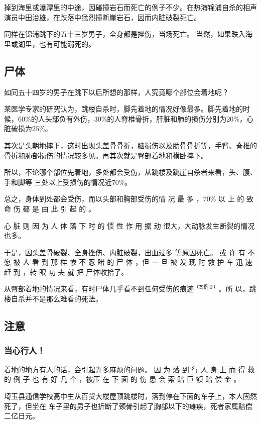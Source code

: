 \documentclass[UTF8]{ctexart}
\begin{document}
掉到海里或瀑潭里的中途，因碰撞岩石而死亡的例子不少。在热海锦浦自杀的相声演员中田治雄，在跌落中猛烈撞断崖岩石，因而内脏破裂死亡。

同样在锦浦跳下的五十三岁男子，全身都是挫伤，当场死亡。
当然，如果跌入海里或湖里，也有可能溺死的。

\subsection{尸体}

如同五十四岁的男子在跳下以后所想的那样，人究竟哪个部位会着地呢？

某医学专家的研究认为，跳楼自杀时，脚先着地的情况好像最多。脚先着地的时候，$60\%$的人头部负有外伤，$30\%$的人脊椎骨折，肝脏和肺的损伤分别为$20\%$，心 脏破损为$25\%$。

其次是头朝地摔下，这时出现头盖骨骨折，脑损伤以及肋骨骨折等，手臂、脊椎的骨折和肺部损伤的情况较多见。再其次就是臀部着地和横卧摔下。

所以，不论哪个部位先着地，多处都会受伤，从跳楼及跳崖自杀者来看，头、腹、手和脚等 三处以上受损伤的情况近$70\%$。

总之，身体到处都会受伤，而以头部和胸部受伤的情 况 最 多 ，$70\%$ 以 上 的 致 命 伤 都 是 由 此 引 起 的 。

心 脏 则 因 为 人 体 落 下 时 的 惯 性 作 用 振 动 很大，大动脉发生断裂的情况也多。

于是，因头盖骨破裂、全身挫伤、内脏破裂，出血过多 等原因死亡。 
或 许 有 不 愿 被 人 看 到 那 样 惨 不 忍 睹 的 尸 体 ，但 一 旦 被 发 现 时 救 护 车 迅 速 赶 到 ，转 眼 功 夫 就 把 尸体收拾了。

从臀部着地的情况来看，有时尸体几乎看不到任何受伤的痕迹$^{（案例９）}$。所 以，跳楼自杀并不是那么难看的死法。

\subsection{注意}

\subsubsection*{当心行人！}

着地的地方有人的话，会引起许多麻烦的问题。 因 为 落 到 行 人 身 上 而 得 救 的 例 子 也 有 好 几 个 ，被压 在 下 面 的 伤 患 会 索 赔 巨 额 赔 偿 金 。

埼玉县通信学校高中生从百货大楼屋顶跳楼时，落到停在下面的车子上，本人固然死了，但坐在 车子里的男子也折断了颈骨引起了胸部以下的瘫痪，死者家属赔偿二亿日元。
\end{document}
